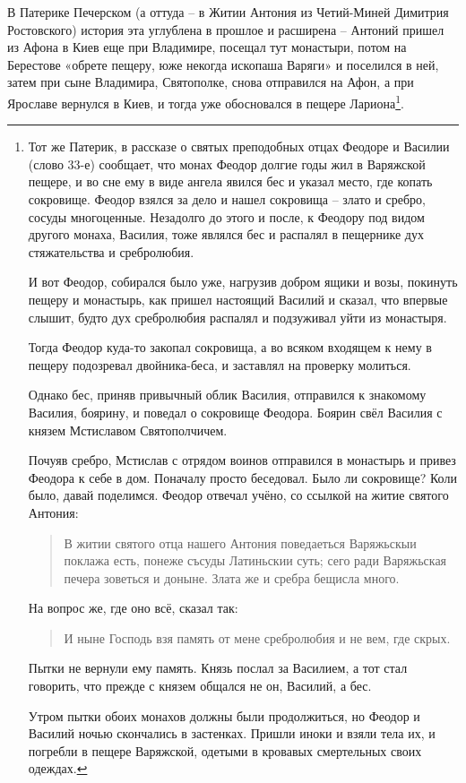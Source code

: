 В Патерике Печерском (а оттуда – в Житии Антония из Четий-Миней Димитрия Ростовского) история эта углублена в прошлое и расширена – Антоний пришел из Афона в Киев еще при Владимире, посещал тут монастыри, потом на Берестове «обрете пещеру, юже некогда ископаша Варяги» и поселился в ней, затем при сыне Владимира, Святополке, снова отправился на Афон, а при Ярославе вернулся в Киев, и тогда уже обосновался в пещере Лариона\footnote{Тот же Патерик, в рассказе о святых преподобных отцах Феодоре и Василии (слово 33-е) сообщает, что монах Феодор долгие годы жил в Варяжской пещере, и во сне ему в виде ангела явился бес и указал место, где копать сокровище. Феодор взялся за дело и нашел сокровища – злато и сребро, сосуды многоценные. Незадолго до этого и после, к Феодору под видом другого монаха, Василия, тоже являлся бес и распалял в пещернике дух стяжательства и сребролюбия. 

И вот Феодор, собирался было уже, нагрузив добром ящики и возы, покинуть пещеру и монастырь, как пришел настоящий Василий и сказал, что впервые слышит, будто дух сребролюбия распалял и подзуживал уйти из монастыря.

Тогда Феодор куда-то закопал сокровища, а во всяком входящем к нему в пещеру подозревал двойника-беса, и заставлял на проверку молиться.

Однако бес, приняв привычный облик Василия, отправился к знакомому Василия, боярину, и поведал о сокровище Феодора. Боярин свёл Василия с князем Мстиславом Святополчичем.

Почуяв сребро, Мстислав с отрядом воинов отправился в монастырь и привез Феодора к себе в дом. Поначалу просто беседовал. Было ли сокровище? Коли было, давай поделимся. Феодор отвечал учёно, со ссылкой на житие святого Антония:

\begin{quotation}
В житии святого отца нашего Антония поведаеться Варяжьскыи поклажа есть, понеже съсуды Латиньскии суть; сего ради Варяжьская печера зоветься и доныне. Злата же и сребра бещисла много.
\end{quotation}

На вопрос же, где оно всё, сказал так:

\begin{quotation}
И ныне Господь взя память от мене сребролюбия и не вем, где скрых.
\end{quotation}

Пытки не вернули ему память. Князь послал за Василием, а тот стал говорить, что прежде с князем общался не он, Василий, а бес. 

Утром пытки обоих монахов должны были продолжиться, но Феодор и Василий ночью скончались в застенках. Пришли иноки и взяли тела их, и погребли в пещере Варяжской, одетыми в кровавых смертельных своих одеждах.}.

